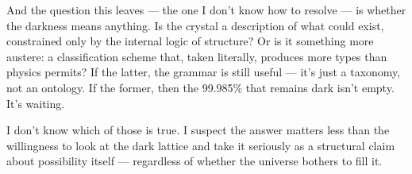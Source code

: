 \documentclass[12pt,a4paper]{article}
\begin{document}
And the question this leaves --- the one I don't know how to resolve --- is whether the darkness means anything. Is the crystal a description of what could exist, constrained only by the internal logic of structure? Or is it something more austere: a classification scheme that, taken literally, produces more types than physics permits? If the latter, the grammar is still useful --- it's just a taxonomy, not an ontology. If the former, then the 99.985\% that remains dark isn't empty. It's waiting.

I don't know which of those is true. I suspect the answer matters less than the willingness to look at the dark lattice and take it seriously as a structural claim about possibility itself --- regardless of whether the universe bothers to fill it.
\end{document}
